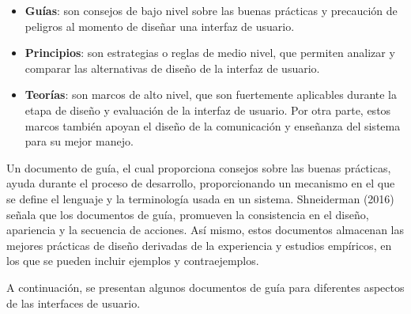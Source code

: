 \begin{itemize}
  \item \textbf{Guías}: son consejos de bajo nivel sobre las buenas prácticas y precaución de peligros al momento de diseñar una interfaz de usuario.
  \item \textbf{Principios}: son estrategias o reglas de medio nivel, que permiten analizar y comparar las alternativas de diseño de la interfaz de usuario.
  \item \textbf{Teorías}: son marcos de alto nivel, que son fuertemente aplicables durante la etapa de diseño y evaluación de la interfaz de usuario. Por otra parte, estos marcos también apoyan el diseño de la comunicación y enseñanza del sistema para su mejor manejo.
\end{itemize}

Un documento de guía, el cual proporciona consejos sobre las buenas prácticas, ayuda durante el proceso de desarrollo, proporcionando un mecanismo en el que se define el lenguaje y la terminología usada en un sistema. Shneiderman (2016) señala que los documentos de guía, promueven la consistencia en el diseño, apariencia y la secuencia de acciones. Así mismo, estos documentos almacenan las mejores prácticas de diseño derivadas de la experiencia y estudios empíricos, en los que se pueden incluir ejemplos y contraejemplos.

A continuación, se presentan algunos documentos de guía para diferentes aspectos de las interfaces de usuario.

